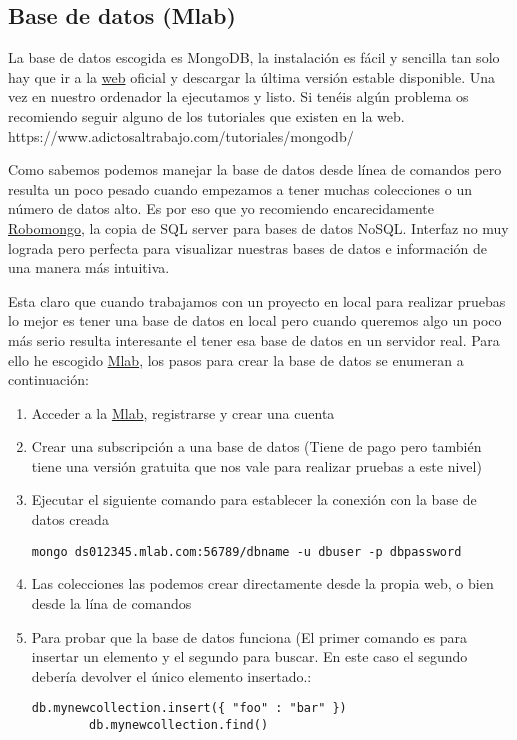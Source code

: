 \subsection{Base de datos (Mlab)}
La base de datos escogida es MongoDB, la instalación es fácil y sencilla tan solo hay que ir a la \hyperlink{http://www.mongodb.org/downloads}{web} oficial y descargar la última versión estable disponible. Una vez en nuestro ordenador la ejecutamos y listo.  Si tenéis algún problema os recomiendo seguir alguno de los tutoriales que existen en la web. https://www.adictosaltrabajo.com/tutoriales/mongodb/

Como sabemos podemos manejar la base de datos desde línea de comandos pero resulta un poco pesado cuando empezamos a tener muchas colecciones o un número de datos alto. Es por eso que yo recomiendo encarecidamente  \hyperlink{https://robomongo.org/}{Robomongo}, la copia de SQL server para bases de datos NoSQL.  Interfaz no muy lograda pero perfecta para visualizar nuestras bases de datos e información de una manera más intuitiva.

	
	Esta claro que cuando trabajamos con un proyecto en local para realizar pruebas lo mejor es tener una base de datos en local pero cuando queremos algo un poco más serio resulta interesante el tener esa base de datos en un servidor real. Para ello he escogido \hyperlink{mlab.com}{Mlab}, los pasos para crear la base de datos se enumeran a continuación: 
	
	\begin{enumerate}
	\item Acceder a la \hyperlink{mlab.com}{Mlab}, registrarse y crear una cuenta
	\item Crear una subscripción a una base de datos (Tiene de pago pero también tiene una versión gratuita que nos vale para realizar pruebas a este nivel)
	\item Ejecutar el siguiente comando para establecer la conexión con la base de datos creada
		\lstset{language=C, breaklines=true, basicstyle=\footnotesize}
		\begin{lstlisting}[frame=single]
		mongo ds012345.mlab.com:56789/dbname -u dbuser -p dbpassword
    	\end{lstlisting}
	\item Las colecciones las podemos crear directamente desde la propia web, o bien desde la lína de comandos 
	\item Para probar que la base de datos funciona (El primer comando es para insertar un elemento y el segundo para buscar. En este caso el segundo debería devolver el único elemento insertado.:
		\lstset{language=C, breaklines=true, basicstyle=\footnotesize}
		\begin{lstlisting}[frame=single]
		db.mynewcollection.insert({ "foo" : "bar" })
		db.mynewcollection.find() 
    	\end{lstlisting}	
\end{enumerate}

